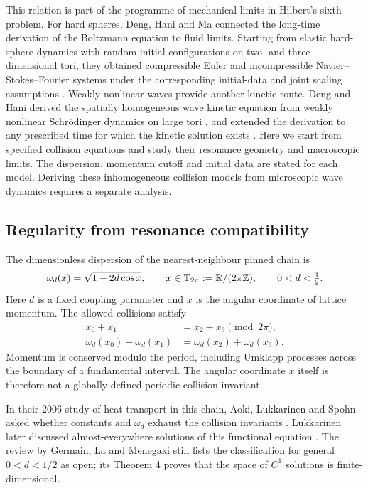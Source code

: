 This relation is part of the programme of mechanical limits in Hilbert's
sixth problem. For hard spheres, Deng, Hani and Ma connected the long-time
derivation of the Boltzmann equation to fluid limits. Starting from elastic
hard-sphere dynamics with random initial configurations on two- and
three-dimensional tori, they obtained compressible Euler and incompressible
Navier--Stokes--Fourier systems under the corresponding initial-data and joint
scaling assumptions \cite[Theorems 1--3]{DHM2025}. Weakly nonlinear waves provide
another kinetic route. Deng and Hani derived the spatially homogeneous wave
kinetic equation from weakly nonlinear Schr\"odinger dynamics on large tori
\cite{DH2023}, and extended the derivation to any prescribed time for which the
kinetic solution exists \cite{DH2024}. Here we start from specified collision
equations and study their resonance geometry and macroscopic limits.
The dispersion, momentum cutoff and initial data are stated for each model.
Deriving these inhomogeneous collision models from microscopic wave dynamics
requires a separate analysis.

\subsection{Regularity from resonance compatibility}

The dimensionless dispersion of the nearest-neighbour pinned chain is
\begin{equation}\label{intro:pinned-dispersion}
 \omega_d(x)=\sqrt{1-2d\cos x},\qquad
 x\in\mathbb T_{2\pi}:=\mathbb R/(2\pi\mathbb Z),\qquad 0<d<\tfrac12.
\end{equation}
Here $d$ is a fixed coupling parameter and $x$ is the angular coordinate
of lattice momentum. The allowed collisions satisfy
\begin{equation}\label{intro:resonance}
 \begin{aligned}
 x_0+x_1&=x_2+x_3\pmod{2\pi},\\
 \omega_d(x_0)+\omega_d(x_1)&=\omega_d(x_2)+\omega_d(x_3).
 \end{aligned}
\end{equation}
Momentum is conserved modulo the period, including Umklapp processes across
the boundary of a fundamental interval. The angular coordinate $x$ itself
is therefore not a globally defined periodic collision invariant.

In their 2006 study of heat transport in this chain, Aoki, Lukkarinen and Spohn
asked whether constants and $\omega_d$ exhaust the collision invariants
\cite[after (4.10)]{ALS2006}. Lukkarinen later discussed almost-everywhere
solutions of this functional equation \cite[Section 3.2]{Luk2016}.
The review by Germain, La and Menegaki \cite[Section 7.2]{GLM2026} still lists
the classification for general $0<d<1/2$ as open; its Theorem 4 proves that
the space of $C^1$ solutions is finite-dimensional.

